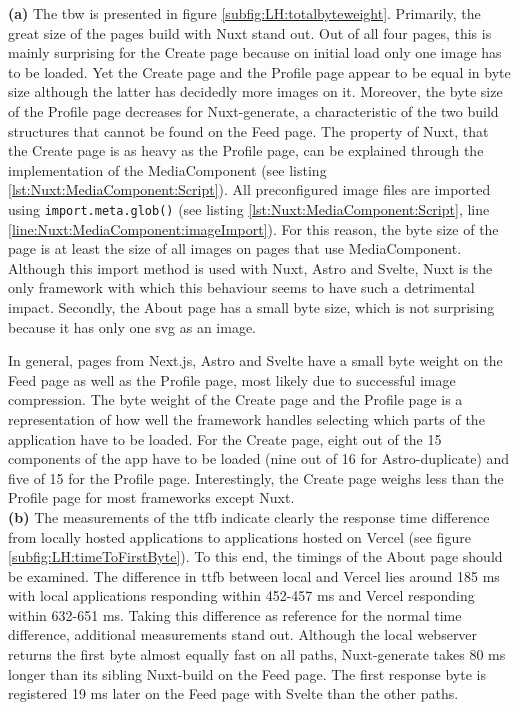 \documentclass[a4paper, 12pt]{article}
\begin{document}
\textbf{(a)} The \acrlong{tbw} is presented in figure \ref{subfig:LH:totalbyteweight}.
Primarily, the great size of the pages build with Nuxt stand out.
Out of all four pages, this is mainly surprising for the Create page because on initial load only one image has to be loaded.
Yet the Create page and the Profile page appear to be equal in byte size although the latter has decidedly more images on it.
Moreover, the byte size of the Profile page decreases for Nuxt-generate, a characteristic of the two build structures that cannot be found on the Feed page.
The property of Nuxt, that the Create page is as heavy as the Profile page, can be explained through the implementation of the MediaComponent (see listing \ref{lst:Nuxt:MediaComponent:Script}).
All preconfigured image files are imported using \lstinline{import.meta.glob()} (see listing \ref{lst:Nuxt:MediaComponent:Script}, line \ref{line:Nuxt:MediaComponent:imageImport}).
For this reason, the byte size of the page is at least the size of all images on pages that use MediaComponent.
Although this import method is used with Nuxt, Astro and Svelte, Nuxt is the only framework with which this behaviour seems to have such a detrimental impact.
Secondly, the About page has a small byte size, which is not surprising because it has only one \acrshort{svg} as an image.

In general, pages from Next.js, Astro and Svelte have a small byte weight on the Feed page as well as the Profile page, most likely due to successful image compression.
The byte weight of the Create page and the Profile page is a representation of how well the framework handles selecting which parts of the application have to be loaded.
For the Create page, eight out of the 15 components of the app have to be loaded (nine out of 16 for Astro-duplicate) and five of 15 for the Profile page.
Interestingly, the Create page weighs less than the Profile page for most frameworks except Nuxt.
\\

\textbf{(b)} The measurements of the \acrlong{ttfb} indicate clearly the response time difference from locally hosted applications to applications hosted on Vercel (see figure \ref{subfig:LH:timeToFirstByte}).
To this end, the timings of the About page should be examined.
The difference in \acrshort{ttfb} between local and Vercel lies around 185 ms with local applications responding within 452-457 ms and Vercel responding within 632-651 ms.
Taking this difference as reference for the normal time difference, additional measurements stand out.
Although the local webserver returns the first byte almost equally fast on all paths, Nuxt-generate takes 80 ms longer than its sibling Nuxt-build on the Feed page.
The first response byte is registered 19 ms later on the Feed page with Svelte than the other paths.
\end{document}
